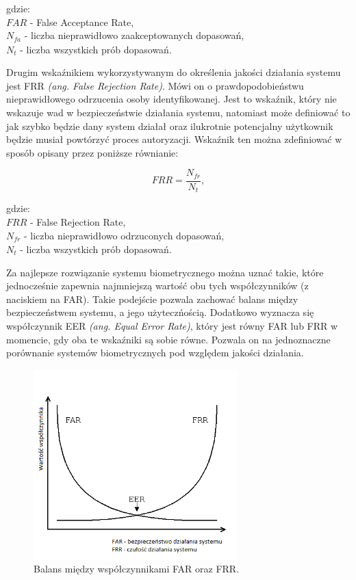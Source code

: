 \documentclass[10pt,polish,a4paper,oneside]{ppfcmthesis}
\begin{document}
\noindent
gdzie:\\
\indent $\mathit{FAR}$ - False Acceptance Rate,\\
\indent $N_{\mathit{fa}}$ - liczba nieprawidłowo zaakceptowanych dopasowań,\\
\indent $N_{t}$ - liczba wszystkich prób dopasowań.\newline

Drugim wska\'znikiem wykorzystywanym do określenia jakości działania systemu jest FRR \textit{(ang. False Rejection Rate)}.
Mówi on o prawdopodobieństwu nieprawidłowego odrzucenia osoby identyfikowanej. Jest to wska\'znik, który
nie wskazuje wad w bezpieczeństwie działania systemu, natomiast może definiowa\'c to jak
szybko będzie dany system działał oraz ilukrotnie potencjalny użytkownik będzie musiał powtórzy\'c
proces autoryzacji. Wska\'znik ten można zdefiniowa\'c w sposób opisany przez poniższe równianie:

\begin{equation}
  \mathit{FRR} = \frac{N_{\mathit{fr}}}{N_{t}},
\end{equation}

\noindent
gdzie:\\
\indent $\mathit{FRR}$ - False Rejection Rate,\\
\indent $N_{\mathit{fr}}$ - liczba nieprawidłowo odrzuconych dopasowań,\\
\indent $N_{t}$ - liczba wszystkich prób dopasowań.\newline

Za najlepsze rozwiązanie systemu biometrycznego można uzna\'c takie, które jednocześnie zapewnia
najmniejszą wartoś\'c obu tych współczynników (z naciskiem na FAR). Takie podejście pozwala zachowa\'c balans między bezpieczeństwem
systemu, a jego użyteczńością. Dodatkowo wyznacza się współczynnik EER \textit{(ang. Equal Error Rate)}, który jest równy
FAR lub FRR w momencie, gdy oba te wska\'zniki są sobie równe. Pozwala on na jednoznaczne porównanie systemów
biometrycznych pod względem jakości działania.

\begin{figure}[ht]
  \centering
  \includegraphics[width=0.7\textwidth]{images/experiment/FARFRRERR.png}
  \caption{Balans między współczynnikami FAR oraz FRR.}
\end{figure}
\end{document}
